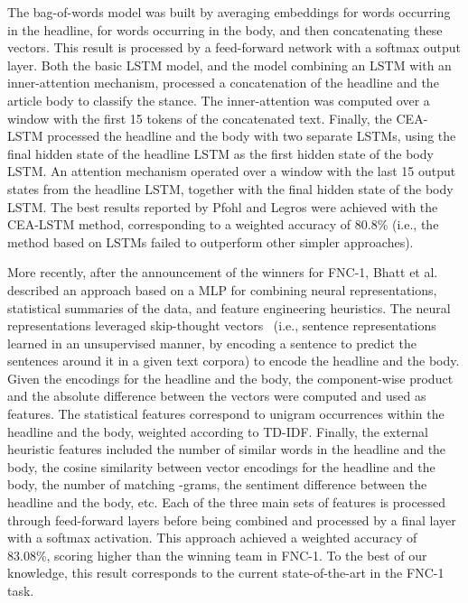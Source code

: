 The bag-of-words model was built by averaging embeddings for words occurring in the headline, for words occurring in the body, and then concatenating these vectors. This result is processed by a feed-forward network with a softmax output layer. Both the basic LSTM model, and the model combining an LSTM with an inner-attention mechanism, processed a concatenation of the headline and the article body to classify the stance. The inner-attention was computed over a window with the first 15 tokens of the concatenated text. Finally, the CEA-LSTM processed the headline and the body with two separate LSTMs, using the final hidden state of the headline LSTM as the first hidden state of the body LSTM. An attention mechanism operated over a  window with the last 15 output states from the headline LSTM, together with the final hidden state of the body LSTM. 
The best results reported by Pfohl and Legros were achieved with the CEA-LSTM method, corresponding to a weighted accuracy of 80.8\% (i.e., the method based on LSTMs failed to outperform other simpler approaches).

More recently, after the announcement of the winners for FNC-1, Bhatt et al.~\cite{combination} described an approach based on a MLP for combining neural representations, statistical summaries of the data, and feature engineering heuristics. The neural representations leveraged skip-thought vectors~\cite{skip} (i.e., sentence representations learned in an unsupervised manner, by encoding a sentence to predict the sentences around it in a given text corpora) to encode the headline and the body. Given the encodings for the headline and the body, the component-wise product and the absolute difference between the vectors were computed and used as features. The statistical features correspond to unigram occurrences within the headline and the body, weighted according to TD-IDF. Finally, the external heuristic features included the number of similar words in the headline and the body, the cosine similarity between vector encodings for the  headline and the body, the number of matching -grams, the sentiment difference between the headline and the body, etc. Each of the three main sets of features is processed through feed-forward layers before being combined and processed by a final layer with a softmax activation. This approach achieved a weighted accuracy of 83.08\%, scoring higher than the winning team in FNC-1. To the best of our knowledge, this result corresponds to the current state-of-the-art in the FNC-1 task.

